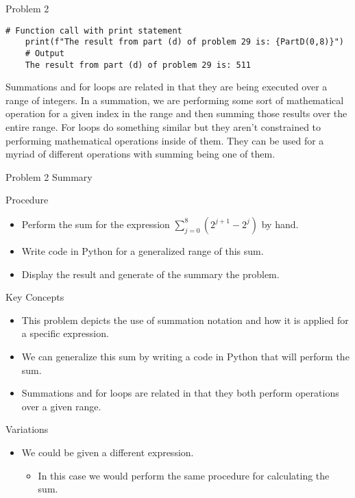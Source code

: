 \begin{problem}{Problem 2}
\begin{highlight}[Solution - \#29]
    \begin{lstlisting}[style=stackoverflow]
    # Function call with print statement
    print(f"The result from part (d) of problem 29 is: {PartD(0,8)}")
    # Output
    The result from part (d) of problem 29 is: 511
    \end{lstlisting}

        Summations and for loops are related in that they are being executed over a range of integers. In a summation, we are performing some sort of mathematical operation for a given index in the 
        range and then summing those results over the entire range. For loops do something similar but they aren't constrained to performing mathematical operations inside of them. They can be used
        for a myriad of different operations with summing being one of them.
    \end{highlight}
\end{problem}

\begin{summary}{Problem 2 Summary}
    \begin{statement}{Procedure}
        \begin{itemize}
            \item Perform the sum for the expression $\sum_{j = 0}^{8}(2^{j + 1} - 2^{j})$ by hand.
            \item Write code in Python for a generalized range of this sum.
            \item Display the result and generate of the summary the problem.
        \end{itemize}
    \end{statement}
    \begin{statement}{Key Concepts}
        \begin{itemize}
            \item This problem depicts the use of summation notation and how it is applied for a specific expression.
            \item We can generalize this sum by writing a code in Python that will perform the sum.
            \item Summations and for loops are related in that they both perform operations over a given range.
        \end{itemize}
    \end{statement}
    \begin{statement}{Variations}
        \begin{itemize}
            \item We could be given a different expression.
            \begin{itemize}
                \item In this case we would perform the same procedure for calculating the sum.
            \end{itemize}
        \end{itemize}
    \end{statement}
\end{summary}

